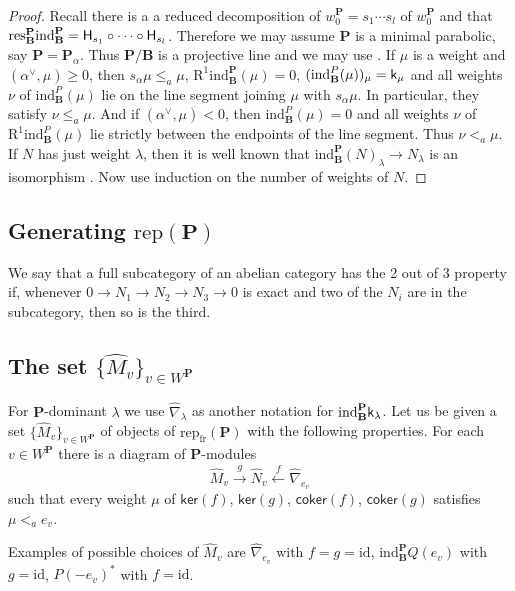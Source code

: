 \documentclass[sn-mathphys-num]{sn-jnl}%
\newcommand{\RR}{\mathrm R}
\newcommand{\rep}{{\mathrm{rep}}}
\newcommand{\ind}{{\mathrm{ind}}}
\newcommand{\res}{{\mathrm{res}}}
\newcommand{\id}{{\mathrm{id}}}
\newcommand{\fr}{{\mathrm {fr}}}
\newcommand{\coker}{{\mathsf{coker}}}
\newcommand{\kernel}{{\mathsf{ker}}}
\newcommand{\sk}{{\sf k}}
\newcommand{\sH}{{\sf H}}
\newcommand{\fb}{\mathbf B}
\newcommand{\bp}{\mathbf P}
\theoremstyle{definition}
\begin{document}
\begin{proof}
Recall there is a a reduced decomposition of $w_0^{\bp}=s_{1}\cdots s_{l}$ of $w_0^\bp$ and that $\res^\bp_\fb\ind_\fb^\bp=\sH_{s_{1}}\circ\cdots\circ\sH_{s_{l}}$. 
 Therefore we may assume $\bp$ is a minimal parabolic, say
$\bp=\bp_\alpha$. Thus $\bp/\fb$ is a projective line and we may use \cite[II Proposition 5.2]{Jan}.
If $\mu$ is a weight and $(\alpha^\vee,\mu)\geq0$,
then $s_\alpha \mu\leq_a \mu$, $\RR^1\ind_\fb^\bp(\mu)=0$, 
$(\ind_\fb^P(\mu))_\mu=\sk_\mu$ and all weights $\nu$ of $\ind_\fb^P(\mu)$ lie on the line segment joining $\mu $ with 
$s_\alpha \mu$. In particular, they satisfy $\nu\leq_a\mu$. And if $(\alpha^\vee,\mu)<0$,
then $\ind_\fb^P(\mu)=0$ and all weights $\nu$ of
$\RR^1\ind_\fb^P(\mu)$ lie strictly between the endpoints of the line segment. Thus $\nu<_a\mu$.
If $N$ has just weight $\lambda$, then it is  well known that $\ind_\fb^\bp(N)_\lambda\to N_\lambda$
is an isomorphism \cite[Propositions 17, 20]{FvdK}. 
Now use induction on the number of weights of $N$.  
\end{proof}



\subsection{Generating $\rep( \bp )$}\label{subsec:repP-generation}

  We say that a full subcategory of an abelian category has the 2 out of 3 property if,
  whenever $0\to N_1\to N_2 \to N_3 \to 0$ is exact and two of the $N_i$ are in the subcategory, then so is the third.
  
  \subsection{The set $\{\hat M_v\}_{v\in W^\bp}$}
  For $\bp$-dominant $\lambda$ we use $\hat\nabla_\lambda$ as another notation for $\ind_\fb^\bp\sk_\lambda$. 
   Let us be given a set $\{\hat M_v\}_{v\in W^\bp}$ of objects of $\rep_\fr( \bp )$  with the following properties.
   For each ${v\in W^\bp}$  there is a diagram of $\bp$-modules
   $$\hat M_v\stackrel{g}\longrightarrow \hat N_v\stackrel{f}\longleftarrow \hat\nabla_{e_v} $$
   such that every weight $\mu$ of $\kernel(f)$, $\kernel(g)$, $\coker(f)$, $\coker(g)$ satisfies $\mu<_a e_v$.
  
  
  Examples of possible choices of $\hat M_v$ are $\hat\nabla_{{e_v}}$ with $f=g=\id$, $\ind_\fb^\bp Q(e_v)$ with $g=\id$, $P(-e_v)^*$
  with $f=\id$. 
  
\end{document}
